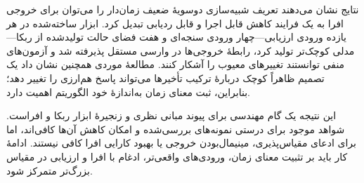 نتایج نشان می‌دهند تعریف شبیه‌سازی دوسویهٔ ضعیف زمان‌دار را می‌توان برای خروجی  افرا به یک فرایند کاهش قابل اجرا و قابل ردیابی تبدیل کرد. ابزار ساخته‌شده در هر یازده ورودی ارزیابی—چهار ورودی سنجه‌ای و هفت فضای حالت تولیدشده از ربکا—مدلی کوچک‌تر تولید کرد، رابطهٔ خروجی‌ها در وارسی مستقل پذیرفته شد و آزمون‌های منفی توانستند تغییرهای معیوب را آشکار کنند. مطالعهٔ موردی همچنین نشان داد یک تصمیم ظاهراً کوچک دربارهٔ ترکیب تأخیرها می‌تواند پاسخ هم‌ارزی را تغییر دهد؛ بنابراین، ثبت معنای زمان به‌اندازهٔ خود الگوریتم اهمیت دارد.

این نتیجه یک گام مهندسی برای پیوند مبانی نظری و زنجیرهٔ ابزار ربکا و افراست. شواهد موجود برای درستی نمونه‌های بررسی‌شده و امکان کاهش آن‌ها کافی‌اند، اما برای ادعای مقیاس‌پذیری، مینیمال‌بودن خروجی یا بهبود کارایی افرا کافی نیستند. ادامهٔ کار باید بر تثبیت معنای زمان، ورودی‌های واقعی‌تر، ادغام با افرا و ارزیابی در مقیاس بزرگ‌تر متمرکز شود.
